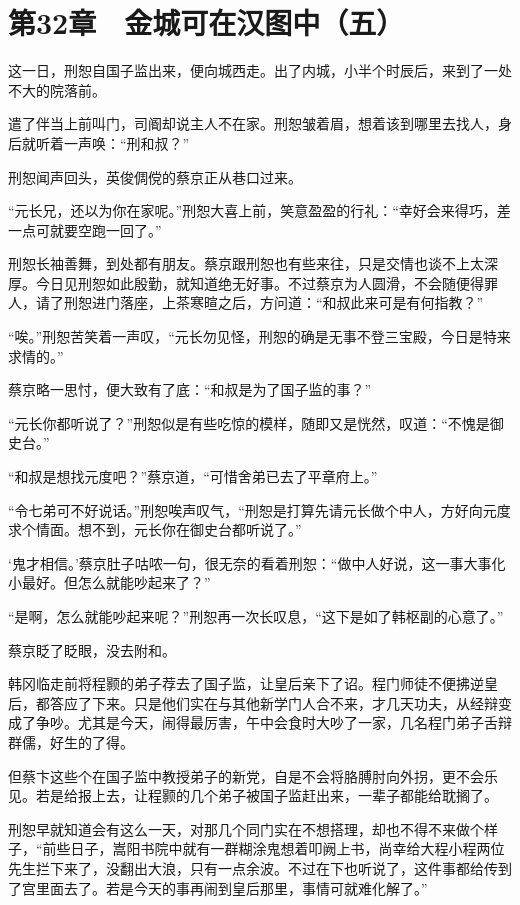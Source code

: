 \section{第32章　金城可在汉图中（五）}

这一日，刑恕自国子监出来，便向城西走。出了内城，小半个时辰后，来到了一处不大的院落前。

遣了伴当上前叫门，司阍却说主人不在家。刑恕皱着眉，想着该到哪里去找人，身后就听着一声唤：“刑和叔？”

刑恕闻声回头，英俊倜傥的蔡京正从巷口过来。

“元长兄，还以为你在家呢。”刑恕大喜上前，笑意盈盈的行礼：“幸好会来得巧，差一点可就要空跑一回了。”

刑恕长袖善舞，到处都有朋友。蔡京跟刑恕也有些来往，只是交情也谈不上太深厚。今日见刑恕如此殷勤，就知道绝无好事。不过蔡京为人圆滑，不会随便得罪人，请了刑恕进门落座，上茶寒暄之后，方问道：“和叔此来可是有何指教？”

“唉。”刑恕苦笑着一声叹，“元长勿见怪，刑恕的确是无事不登三宝殿，今日是特来求情的。”

蔡京略一思忖，便大致有了底：“和叔是为了国子监的事？”

“元长你都听说了？”刑恕似是有些吃惊的模样，随即又是恍然，叹道：“不愧是御史台。”

“和叔是想找元度吧？”蔡京道，“可惜舍弟已去了平章府上。”

“令七弟可不好说话。”刑恕唉声叹气，“刑恕是打算先请元长做个中人，方好向元度求个情面。想不到，元长你在御史台都听说了。”

‘鬼才相信。’蔡京肚子咕哝一句，很无奈的看着刑恕：“做中人好说，这一事大事化小最好。但怎么就能吵起来了？”

“是啊，怎么就能吵起来呢？”刑恕再一次长叹息，“这下是如了韩枢副的心意了。”

蔡京眨了眨眼，没去附和。

韩冈临走前将程颢的弟子荐去了国子监，让皇后亲下了诏。程门师徒不便拂逆皇后，都答应了下来。只是他们实在与其他新学门人合不来，才几天功夫，从经辩变成了争吵。尤其是今天，闹得最厉害，午中会食时大吵了一家，几名程门弟子舌辩群儒，好生的了得。

但蔡卞这些个在国子监中教授弟子的新党，自是不会将胳膊肘向外拐，更不会乐见。若是给报上去，让程颢的几个弟子被国子监赶出来，一辈子都能给耽搁了。

刑恕早就知道会有这么一天，对那几个同门实在不想搭理，却也不得不来做个样子，“前些日子，嵩阳书院中就有一群糊涂鬼想着叩阙上书，尚幸给大程小程两位先生拦下来了，没翻出大浪，只有一点余波。不过在下也听说了，这件事都给传到了宫里面去了。若是今天的事再闹到皇后那里，事情可就难化解了。”

